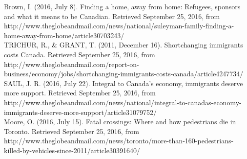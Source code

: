 \documentclass{article}
\begin{document}
\noindent
[17] Brown, I. (2016, July 8). Finding a home, away from home: Refugees, sponsors and what it means to be Canadian. Retrieved September 25, 2016, from http://www.theglobeandmail.com/news/national/suleyman-family-finding-a-home-away-from-home/article30703243/\\

\noindent
[18] TRICHUR, R., \& GRANT, T. (2011, December 16). Shortchanging immigrants costs Canada. Retrieved September 25, 2016, from http://www.theglobeandmail.com/report-on-business/economy/jobs/shortchanging-immigrants-costs-canada/article4247734/\\

\noindent
[19] SAUL, J. R. (2016, July 22). Integral to Canada's economy, immigrants deserve more support. Retrieved September 25, 2016, from \\
http://www.theglobeandmail.com/news/national/integral-to-canadas-economy-immigrants-deserve-more-support/article31079752/\\

\noindent
[20] Moore, O. (2016, July 15). Fatal crossings: Where and how pedestrians die in Toronto. Retrieved September 25, 2016, from \\
http://www.theglobeandmail.com/news/toronto/more-than-160-pedestrians-killed-by-vehicles-since-2011/article30391640/
\end{document}
